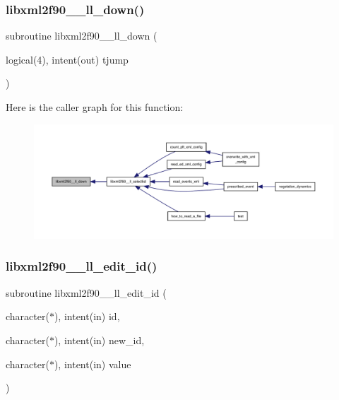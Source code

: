 \subsubsection{\texorpdfstring{libxml2f90\+\_\+\+\_\+ll\+\_\+down()}{libxml2f90\_\_ll\_down()}}
{\footnotesize\ttfamily subroutine libxml2f90\+\_\+\+\_\+ll\+\_\+down (\begin{DoxyParamCaption}\item[{logical(4), intent(out)}]{tjump }\end{DoxyParamCaption})}

Here is the caller graph for this function\+:
\nopagebreak
\begin{figure}[H]
\begin{center}
\leavevmode
\includegraphics[width=350pt]{libxml2f90_8f90__pp_8f90_abe93b7544a083264c1c567ae64b7afa1_icgraph}
\end{center}
\end{figure}
\mbox{\label{libxml2f90_8f90__pp_8f90_a3c214cdd6b674131bd309980b862b11d}} 
\subsubsection{\texorpdfstring{libxml2f90\+\_\+\+\_\+ll\+\_\+edit\+\_\+id()}{libxml2f90\_\_ll\_edit\_id()}}
{\footnotesize\ttfamily subroutine libxml2f90\+\_\+\+\_\+ll\+\_\+edit\+\_\+id (\begin{DoxyParamCaption}\item[{character($\ast$), intent(in)}]{id,  }\item[{character($\ast$), intent(in)}]{new\+\_\+id,  }\item[{character($\ast$), intent(in)}]{value }\end{DoxyParamCaption})}

